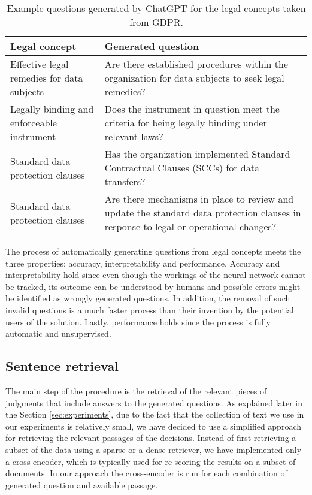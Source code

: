 \begin{table}[htbp]
  \centering\begin{tabular}{l p{6cm}}
    \hline
    \textbf{Legal concept} & \textbf{Generated question} \\
\hline
Effective legal remedies for data subjects & Are there established procedures within the organization for data subjects to seek legal remedies?\\
\hline
Legally binding and enforceable instrument & Does the instrument in question meet the criteria for being legally binding under relevant laws?\\
\hline
Standard data protection clauses & Has the organization implemented Standard Contractual Clauses (SCCs) for data transfers?\\
\hline
Standard data protection clauses & Are there mechanisms in place to review and update the standard data protection clauses in response to legal or operational changes?\\
  \end{tabular}
  \caption{Example questions generated by ChatGPT for the legal concepts taken from GDPR.}
  \label{tab:question-examples}
\end{table}

The process of automatically generating questions from legal concepts meets the three properties: accuracy, interpretability and performance.
Accuracy and interpretability hold since even though the workings of the neural network cannot be tracked, its outcome can be understood by humans and possible errors might be identified as wrongly generated questions. In addition, the removal of such invalid questions 
is a much faster process than their invention by the potential users of the solution.
Lastly, performance holds since the process is fully automatic and unsupervised.

\subsection{Sentence retrieval}

The main step of the procedure is the retrieval of the relevant pieces of judgments that include answers to the
generated questions. As explained later in the Section \ref{sec:experiments}, due to the fact that the collection of text we use in our experiments
is relatively small, we have decided to use a simplified approach for retrieving the relevant passages of the decisions. 
Instead of first retrieving a subset of the data using a sparse or a dense retriever, we have implemented only a cross-encoder, which is typically used for re-scoring the results on a subset of documents.
In our approach the cross-encoder is run for each combination of generated question and available passage. 

